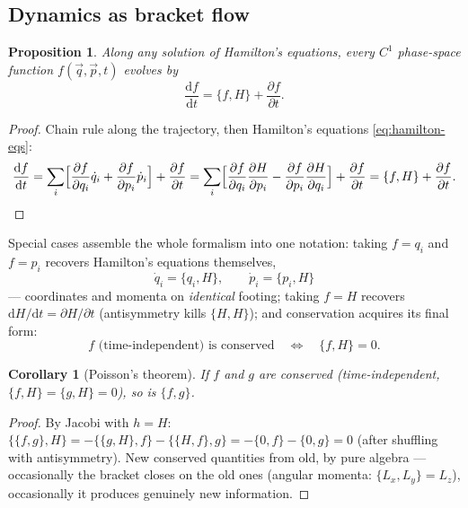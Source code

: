 \documentclass[11pt]{article}
\theoremstyle{plain}
\newtheorem{proposition}[theorem]{Proposition}
\newtheorem{corollary}[theorem]{Corollary}
\theoremstyle{definition}
\theoremstyle{remark}
\newcommand{\dd}{\mathrm{d}}
\newcommand{\pd}[2]{\frac{\partial #1}{\partial #2}}
\newcommand{\vq}{\vec{q}}
\newcommand{\vp}{\vec{p}}
\begin{document}
\subsection{Dynamics as bracket flow}

\begin{proposition}\label{prop:bracket-flow}
Along any solution of Hamilton's equations, every $C^1$ phase-space
function $f(\vq,\vp,t)$ evolves by
\begin{equation}
  \boxed{\;
  \frac{\dd f}{\dd t} = \{f, H\} + \pd{f}{t} .
  \;}
\end{equation}
\end{proposition}
\begin{proof}
Chain rule along the trajectory, then Hamilton's equations
\eqref{eq:hamilton-eqs}:
\begin{equation}
  \frac{\dd f}{\dd t}
  = \sum_i\Bigl[\pd{f}{q_i}\dot q_i + \pd{f}{p_i}\dot p_i\Bigr] + \pd{f}{t}
  = \sum_i\Bigl[\pd{f}{q_i}\pd{H}{p_i} - \pd{f}{p_i}\pd{H}{q_i}\Bigr]
  + \pd{f}{t}
  = \{f,H\} + \pd{f}{t} . \qedhere
\end{equation}
\end{proof}

Special cases assemble the whole formalism into one notation: taking
$f = q_i$ and $f = p_i$ recovers Hamilton's equations themselves,
\begin{equation}
  \dot q_i = \{q_i, H\},
  \qquad
  \dot p_i = \{p_i, H\}
\end{equation}
--- coordinates and momenta on \emph{identical} footing; taking $f = H$
recovers $\dd H/\dd t = \partial H/\partial t$ (antisymmetry kills
$\{H,H\}$); and conservation acquires its final form:
\begin{equation}
  f \text{ (time-independent) is conserved}
  \quad\Longleftrightarrow\quad
  \{f, H\} = 0 .
\end{equation}

\begin{corollary}[Poisson's theorem]\label{cor:poisson-thm}
If $f$ and $g$ are conserved (time-independent, $\{f,H\} = \{g,H\} = 0$),
so is $\{f, g\}$.
\end{corollary}
\begin{proof}
By Jacobi with $h = H$:
$\{\{f,g\}, H\} = -\{\{g,H\},f\} - \{\{H,f\},g\} = -\{0,f\} - \{0,g\} = 0$
(after shuffling with antisymmetry). New conserved quantities from old,
by pure algebra --- occasionally the bracket closes on the old ones
(angular momenta: $\{L_x, L_y\} = L_z$), occasionally it produces
genuinely new information.
\end{proof}
\end{document}
